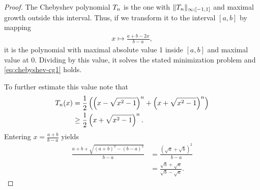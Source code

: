 \begin{proof}
  The Chebyshev polynomial $T_n$ is the one with $\lVert T_n\rVert_{\infty;[-1,1]}$ and maximal growth outside this interval. Thus,
  if we transform it to the interval $[a,b]$ by mapping
  \begin{gather}
    x \mapsto \frac{a+b-2x}{b-a},
  \end{gather}
  it is the polynomial with maximal absolute value 1 inside $[a,b]$
  and maximal value at 0. Dividing by this value, it solves the
  stated minimization problem and \eqref{eq:chebyshev-cg1} holds.

  To further estimate this value note that
  \begin{align}
    T_n(x)
    &= \frac12
      \left(\left(x-\sqrt{x^2-1}\right)^n
      +
      \left(x+\sqrt{x^2-1}\right)^n\right)\\
    &\ge \frac12\left(x+\sqrt{x^2-1}\right)^n.
  \end{align}
  Entering $x = \frac{a+b}{b-a}$ yields
  \begin{align}
    \frac{a+b+\sqrt{(a+b)^2-(b-a)^2}}{b-a}
    &= \frac{(\sqrt a + \sqrt b)^2}{b-a}\\
    &= \frac{\sqrt b + \sqrt a}{\sqrt b-\sqrt a}.
  \end{align}
\end{proof}

